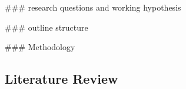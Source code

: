 



\#\#\# research questions and working hypothesis


\#\#\# outline structure


\#\#\# Methodology





\subsection{Literature Review}


